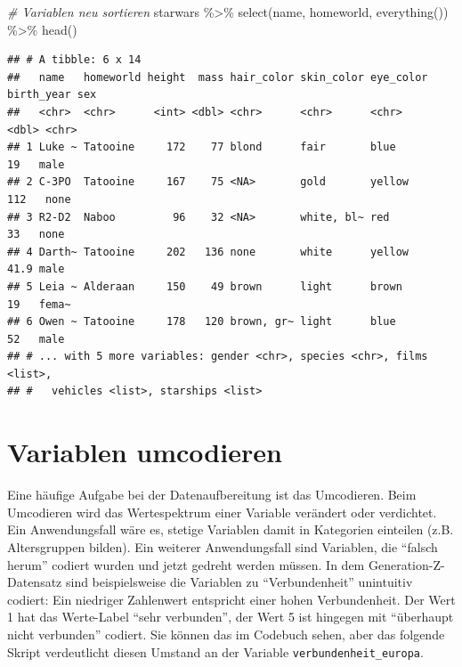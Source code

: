 \documentclass[
]{book}
\newenvironment{Shaded}{\begin{snugshade}}{\end{snugshade}}
\newcommand{\CommentTok}[1]{\textcolor[rgb]{0.56,0.35,0.01}{\textit{#1}}}
\newcommand{\FunctionTok}[1]{\textcolor[rgb]{0.00,0.00,0.00}{#1}}
\newcommand{\NormalTok}[1]{#1}
\newcommand{\SpecialCharTok}[1]{\textcolor[rgb]{0.00,0.00,0.00}{#1}}
\begin{document}
\begin{Shaded}
\begin{Highlighting}[]
\CommentTok{\# Variablen neu sortieren}
\NormalTok{starwars }\SpecialCharTok{\%\textgreater{}\%} 
  \FunctionTok{select}\NormalTok{(name, homeworld, }\FunctionTok{everything}\NormalTok{()) }\SpecialCharTok{\%\textgreater{}\%} 
  \FunctionTok{head}\NormalTok{()}
\end{Highlighting}
\end{Shaded}

\begin{verbatim}
## # A tibble: 6 x 14
##   name   homeworld height  mass hair_color skin_color eye_color birth_year sex  
##   <chr>  <chr>      <int> <dbl> <chr>      <chr>      <chr>          <dbl> <chr>
## 1 Luke ~ Tatooine     172    77 blond      fair       blue            19   male 
## 2 C-3PO  Tatooine     167    75 <NA>       gold       yellow         112   none 
## 3 R2-D2  Naboo         96    32 <NA>       white, bl~ red             33   none 
## 4 Darth~ Tatooine     202   136 none       white      yellow          41.9 male 
## 5 Leia ~ Alderaan     150    49 brown      light      brown           19   fema~
## 6 Owen ~ Tatooine     178   120 brown, gr~ light      blue            52   male 
## # ... with 5 more variables: gender <chr>, species <chr>, films <list>,
## #   vehicles <list>, starships <list>
\end{verbatim}

\hypertarget{variablen-umcodieren}{%
\section{Variablen umcodieren}\label{variablen-umcodieren}}

Eine häufige Aufgabe bei der Datenaufbereitung ist das Umcodieren. Beim Umcodieren wird das Wertespektrum einer Variable verändert oder verdichtet. Ein Anwendungsfall wäre es, stetige Variablen damit in Kategorien einteilen (z.B. Altersgruppen bilden). Ein weiterer Anwendungsfall sind Variablen, die ``falsch herum'' codiert wurden und jetzt gedreht werden müssen. In dem Generation-Z-Datensatz sind beispielsweise die Variablen zu ``Verbundenheit'' unintuitiv codiert: Ein niedriger Zahlenwert entspricht einer hohen Verbundenheit. Der Wert 1 hat das Werte-Label ``sehr verbunden'', der Wert 5 ist hingegen mit ``überhaupt nicht verbunden'' codiert. Sie können das im Codebuch sehen, aber das folgende Skript verdeutlicht diesen Umstand an der Variable \texttt{verbundenheit\_europa}.
\end{document}
